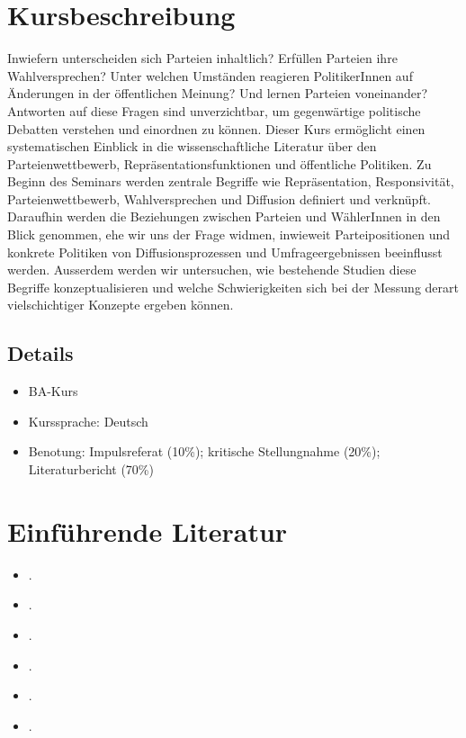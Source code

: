 \documentclass[abstract=on,parskip=full,headings=standardclasses,fontsize=11pt,paper=a4]{scrartcl}
\begin{document}
\section*{Kursbeschreibung}

Inwiefern unterscheiden sich Parteien inhaltlich? Erfüllen Parteien ihre Wahlversprechen? Unter welchen Umständen reagieren PolitikerInnen auf Änderungen in der öffentlichen Meinung? Und lernen Parteien voneinander? Antworten auf diese Fragen sind unverzichtbar, um gegenwärtige politische Debatten verstehen und einordnen zu können. Dieser Kurs ermöglicht einen systematischen Einblick in die wissenschaftliche Literatur über den Parteienwettbewerb, Repräsentationsfunktionen und öffentliche Politiken. Zu Beginn des Seminars werden zentrale Begriffe wie Repräsentation, Responsivität, Parteienwettbewerb, Wahlversprechen und Diffusion definiert und verknüpft. Daraufhin werden die Beziehungen zwischen Parteien und WählerInnen in den Blick genommen, ehe wir uns der Frage widmen, inwieweit Parteipositionen und konkrete Politiken von Diffusionsprozessen und Umfrageergebnissen beeinflusst werden. Ausserdem werden wir untersuchen, wie bestehende Studien diese Begriffe konzeptualisieren und welche Schwierigkeiten sich bei der Messung derart vielschichtiger Konzepte ergeben können.

\subsection*{Details}

\begin{itemize}
\item BA-Kurs
\item  Kurssprache: Deutsch
\item Benotung: Impulsreferat (10\%); kritische Stellungnahme (20\%); Literaturbericht (70\%)
\end{itemize}



\section*{Einführende Literatur}

\begin{itemize}
\item {}.
\item {}.
\item {}.
\item {}.
\item {}.
\item {}.
\end{itemize}
\end{document}
